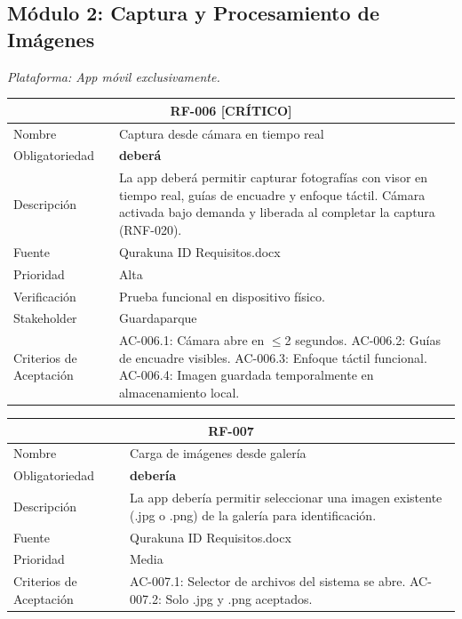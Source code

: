 \documentclass[12pt, a4paper]{article}
\newcommand{\criticomark}{\textcolor{criticolor}{\textbf{[CR\'ITICO]}}}
\begin{document}
\subsection{M\'odulo 2: Captura y Procesamiento de Im\'agenes}

\textit{Plataforma: App m\'ovil exclusivamente.}

\begin{longtable}{|p{3cm}|p{11.5cm}|}
\hline
\multicolumn{2}{|c|}{\textbf{RF-006} \criticomark} \\
\hline
Nombre & Captura desde c\'amara en tiempo real \\
\hline
Obligatoriedad & \textbf{deber\'a} \\
\hline
Descripci\'on & La app deber\'a permitir capturar fotograf\'ias con visor en tiempo real, gu\'ias de encuadre y enfoque t\'actil. C\'amara activada bajo demanda y liberada al completar la captura (RNF-020). \\
\hline
Fuente & Qurakuna ID Requisitos.docx \\
\hline
Prioridad & Alta \\
\hline
Verificaci\'on & Prueba funcional en dispositivo f\'isico. \\
\hline
Stakeholder & Guardaparque \\
\hline
Criterios de Aceptaci\'on &
AC-006.1: C\'amara abre en $\leq$2 segundos. \newline
AC-006.2: Gu\'ias de encuadre visibles. \newline
AC-006.3: Enfoque t\'actil funcional. \newline
AC-006.4: Imagen guardada temporalmente en almacenamiento local. \\
\hline
\end{longtable}

\begin{longtable}{|p{3cm}|p{11.5cm}|}
\hline
\multicolumn{2}{|c|}{\textbf{RF-007}} \\
\hline
Nombre & Carga de im\'agenes desde galer\'ia \\
\hline
Obligatoriedad & \textbf{deber\'ia} \\
\hline
Descripci\'on & La app deber\'ia permitir seleccionar una imagen existente (.jpg o .png) de la galer\'ia para identificaci\'on. \\
\hline
Fuente & Qurakuna ID Requisitos.docx \\
\hline
Prioridad & Media \\
\hline
Criterios de Aceptaci\'on &
AC-007.1: Selector de archivos del sistema se abre. \newline
AC-007.2: Solo .jpg y .png aceptados. \\
\hline
\end{longtable}
\end{document}
